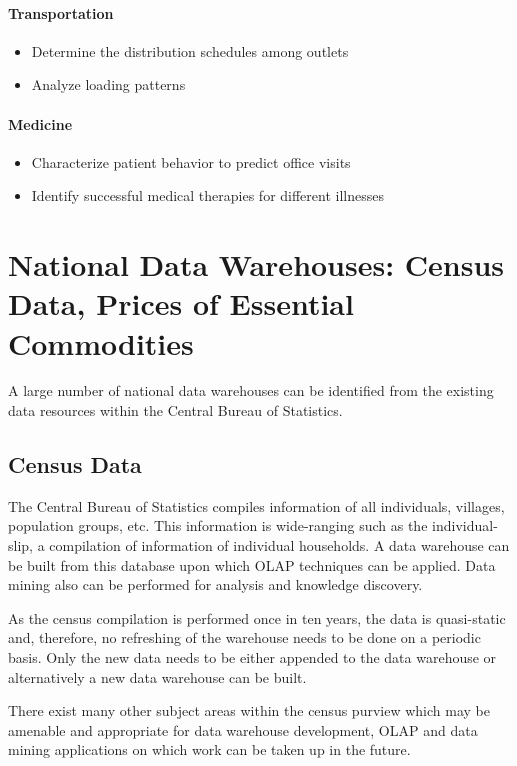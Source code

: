 \paragraph*{Transportation}
\begin{itemize}
	\item Determine the distribution schedules among outlets
	\item Analyze loading patterns
\end{itemize}

\paragraph*{Medicine}
\begin{itemize}
	\item Characterize patient behavior to predict office visits
	\item Identify successful medical therapies for different illnesses
\end{itemize}


\section{National Data Warehouses: Census Data, Prices of Essential Commodities}
A large number of national data warehouses can be identified from the existing
data resources within the Central Bureau of Statistics.

\subsection*{Census Data}
The Central Bureau of Statistics compiles
information of all individuals, villages, population groups, etc. This information
is wide-ranging such as the individual-slip, a compilation of information of
individual households. A data warehouse can be built from this database upon which OLAP
techniques can be applied. Data mining also can be performed for analysis and
knowledge discovery.

As the census compilation is performed once in ten years, the data is
quasi-static and, therefore, no refreshing of the warehouse needs to be done on
a periodic basis. Only the new data needs to be either appended to the data
warehouse or alternatively a new data warehouse can be built.

There exist many other subject areas within the
census purview which may be amenable and appropriate for data warehouse
development, OLAP and data mining applications on which work can be taken
up in the future.

